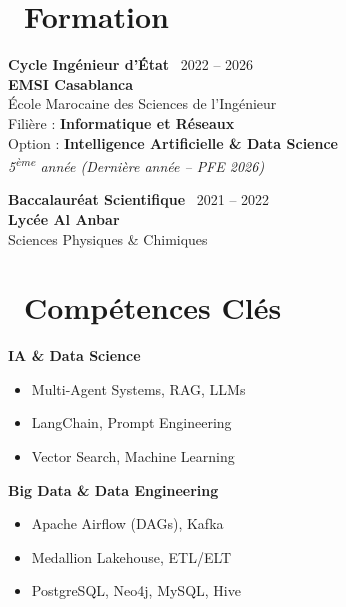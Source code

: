\documentclass[a4paper,9pt]{extarticle}
\def\faGraduationCap{}%
\def\faCubes{}%
\def\faCalendar*{}%
\newcommand{\cvhighlight}[1]{\textcolor{accentteal}{\textbf{#1}}}
\begin{document}
\begin{minipage}[t]{0.405\textwidth}

  \section{\faGraduationCap\ Formation}

  \textbf{\color{primary}\small Cycle Ingénieur d'État} \hfill {\scriptsize\color{textmuted}\faCalendar*\ 2022 -- 2026}\\
  {\small \textbf{EMSI Casablanca}}\\
  {\footnotesize École Marocaine des Sciences de l'Ingénieur}\\
  {\footnotesize Filière : \cvhighlight{Informatique et Réseaux}}\\
  {\footnotesize Option : \textbf{Intelligence Artificielle \& Data Science}}\\
  {\scriptsize\textit{5\textsuperscript{ème} année (Dernière année -- PFE 2026)}}

  \vspace{3pt}

  \textbf{\color{primary}\small Baccalauréat Scientifique} \hfill {\scriptsize\color{textmuted}\faCalendar*\ 2021 -- 2022}\\
  {\small \textbf{Lycée Al Anbar}}\\
  {\footnotesize Sciences Physiques \& Chimiques}

  \vspace{3pt}

  \section{\faCubes\ Compétences Clés}

  {\footnotesize \textbf{\color{accent} IA \& Data Science}}
  \begin{itemize}
    \item Multi-Agent Systems, RAG, LLMs
    \item LangChain, Prompt Engineering
    \item Vector Search, Machine Learning
  \end{itemize}

  \vspace{2pt}
  {\footnotesize \textbf{\color{accent} Big Data \& Data Engineering}}
  \begin{itemize}
    \item Apache Airflow (DAGs), Kafka
    \item Medallion Lakehouse, ETL/ELT
    \item PostgreSQL, Neo4j, MySQL, Hive
  \end{itemize}


\end{minipage}
\end{document}
